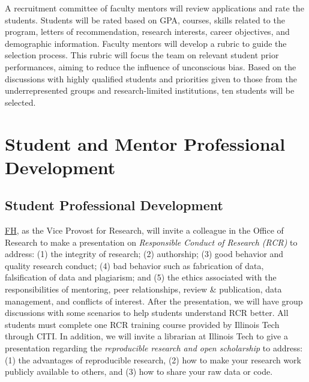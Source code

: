 \documentclass[11pt]{NSFamsart}
\newcommand{\FH}{\hyperlink{FHlink}{FH}\xspace}
\begin{document}
A recruitment committee of faculty mentors will review applications and rate the students. Students
will be rated based on GPA, courses, skills related to the program, letters of recommendation,
research interests, career objectives, and demographic information. Faculty mentors
will develop a rubric to guide the selection
process. This rubric will focus the team on relevant student prior performances, aiming to reduce the
influence of unconscious bias. Based on the
discussions with highly qualified students and priorities given to those from the underrepresented
groups and research-limited institutions, ten students will be selected.


\section{Student and Mentor Professional Development}
\subsection{Student Professional Development}
\FH, as the Vice Provost for Research, will invite a colleague in the  Office of Research to make a presentation on \emph{Responsible Conduct of Research (RCR)} to address: (1) the integrity of research; (2) authorship;  (3) good behavior
and quality research conduct; (4) bad behavior such as fabrication of data, falsification of data and
plagiarism; and (5) the ethics associated with the responsibilities of mentoring, peer relationships, review \& publication, data management, and conflicts of interest. After the presentation, we will have group discussions with some scenarios to help students understand RCR better.
All students must complete one RCR training course provided by Illinois Tech through CITI.  In addition, we will invite a librarian at Illinois Tech to give a presentation regarding the \emph{reproducible research and open scholarship} to address: (1) the advantages of  reproducible research, (2) how to make your research work publicly available to others, and
(3) how to share your raw data or code.
\end{document}
